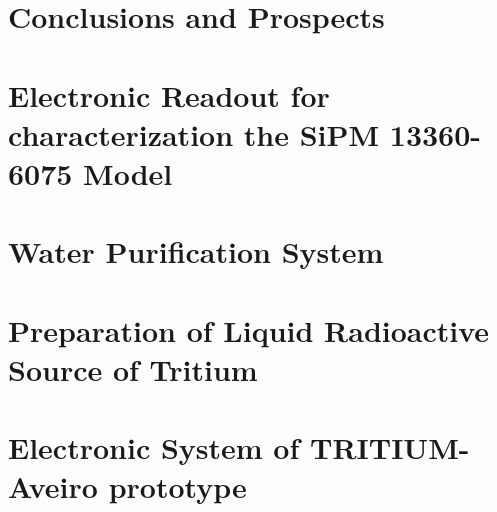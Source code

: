 \documentclass[12pt,a4paper]{book}
\begin{document}
\chapter{Conclusions and Prospects}  \label{chap:Conclusions}

\newpage

%


\appendix
\appendixpage
\noappendicestocpagenum
\addappheadtotoc

\chapter{Electronic Readout for characterization the SiPM 13360-6075 Model}\label{App:ElectronicReadoutSiPM}


\chapter{Water Purification System}\label{App:UltraPureWaterSystem}


\chapter{Preparation of Liquid Radioactive Source of Tritium}\label{App:TritiumSourcePreparation}


\chapter{Electronic System of TRITIUM-Aveiro prototype}\label{App:ElectronicSystemAveiro}


%

%




\end{document}
